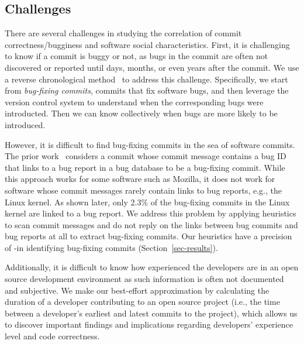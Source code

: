 \subsection{Challenges}
There are several challenges in studying the correlation of commit correctness/bugginess and software social characteristics.
First, it is challenging to know if a commit is buggy or not,
as bugs in the commit are often not 
discovered or reported until days, months, or even years after the commit. 
We use a reverse chronological method~\cite{sliwerski-msr-2005} to address this challenge. 
Specifically, we start from {\em bug-fixing commits}, commits that fix software bugs, 
and then leverage the version control system to understand when the corresponding bugs were introducted. 
Then we can know collectively when bugs are more likely to be introduced. 

However, it is difficult to find bug-fixing commits in the sea of software commits.
The prior work~\cite{sliwerski-msr-2005} considers a commit whose commit message contains a bug 
ID that links to a bug report in a bug database to be a bug-fixing commit. While this
approach works for some software such as Mozilla, it does not work for software whose commit messages
rarely contain links to bug reports, e.g., the Linux kernel.
As shown later, only 2.3\% of the bug-fixing commits in the Linux kernel are linked to a bug report.
We address this problem by applying heuristics 
to scan commit messages and do not reply on the links between bug commits and bug reports at all to extract bug-fixing commits.
Our heuristics have a precision of \postP-\linuxP in identifying bug-fixing commits (Section~\ref{sec-results}).

Additionally, it is difficult to know how experienced the developers are in an open source development
environment as such information is often not documented and subjective. 
We make our best-effort approximation by calculating the duration of a developer
contributing to an open source project (i.e., the time between a developer's
earliest and latest commits to the project), which allows us to discover important findings 
and implications regarding developers' experience level and code correctness. 

